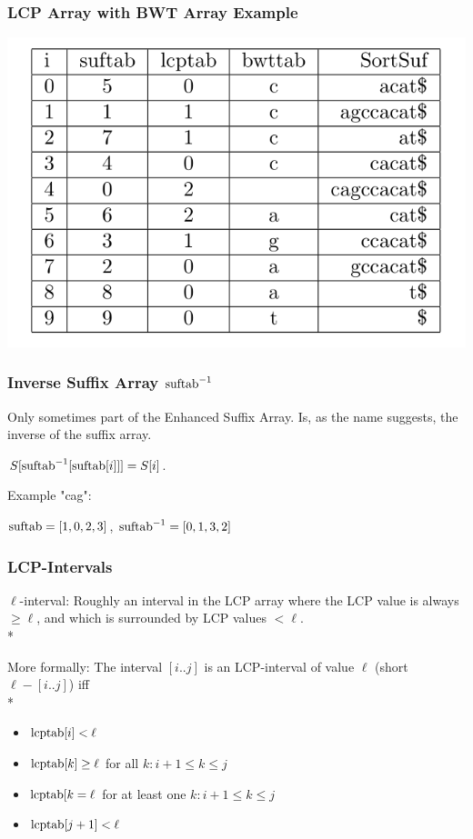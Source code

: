 \documentclass[compress,handout]{beamer} %
\begin{document}
\begin{frame}
	\frametitle{LCP Array with BWT Array Example}
        \includegraphics[width=\textwidth, height=\textheight, keepaspectratio=true]{esa_with_bwttab_example}
\end{frame}

\begin{frame}
	\frametitle{Inverse Suffix Array $\hbox{suftab}^{-1}$}
	Only sometimes part of the Enhanced Suffix Array.
	Is, as the name suggests, the inverse of the suffix array.

	$S[\hbox{suftab}^{-1}[\hbox{suftab}[i]]]=S[i]$.

	Example "cag":

	$\hbox{suftab}=[1,0,2,3]$, $\hbox{suftab}^{-1}=[0,1,3,2]$
\end{frame}

\begin{frame}
	\frametitle{LCP-Intervals}
	$\ell$-interval: Roughly an interval in the LCP array where the LCP value is always
	$\ge \ell$, and which is surrounded by LCP values $< \ell$.\\*

	\vspace{5mm}
	More formally:
	The interval $[i..j]$ is an LCP-interval of value $\ell$ (short $\ell-[i..j]$)
	iff \\*
	\begin{itemize}
		\item $\hbox{lcptab}[i]<\ell$
		\item $\hbox{lcptab}[k]\ge \ell$ for all $k: i+1 \le k \le j$
		\item $\hbox{lcptab}[k=\ell$ for at least one $k: i+1 \le k \le j$
		\item $\hbox{lcptab}[j+1]<\ell$
	\end{itemize}
\end{frame}
\end{document}

